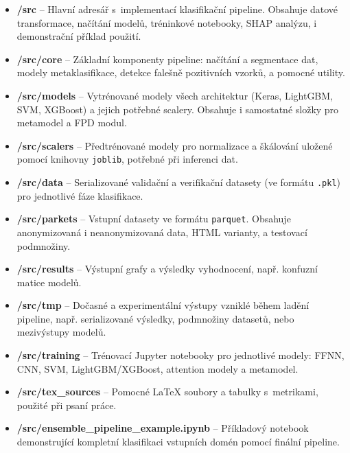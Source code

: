 \begin{itemize}
    \item \textbf{/src} – Hlavní adresář s~implementací klasifikační pipeline. Obsahuje datové transformace, načítání modelů, tréninkové notebooky, SHAP analýzu, i demonstrační příklad použití.
    
    \item \textbf{/src/core} – Základní komponenty pipeline: načítání a segmentace dat, modely metaklasifikace, detekce falešně pozitivních vzorků, a pomocné utility.
    
    \item \textbf{/src/models} – Vytrénované modely všech architektur (Keras, LightGBM, SVM, XGBoost) a jejich potřebné scalery. Obsahuje i samostatné složky pro metamodel a FPD modul.
    
    \item \textbf{/src/scalers} – Předtrénované modely pro normalizace a škálování uložené pomocí knihovny \texttt{joblib}, potřebné při inferenci dat.
    
    \item \textbf{/src/data} – Serializované validační a verifikační datasety (ve formátu \texttt{.pkl}) pro jednotlivé fáze klasifikace.
    
    \item \textbf{/src/parkets} – Vstupní datasety ve formátu \texttt{parquet}. Obsahuje anonymizovaná i neanonymizovaná data, HTML varianty, a testovací podmnožiny.
    
    \item \textbf{/src/results} – Výstupní grafy a výsledky vyhodnocení, např. konfuzní matice modelů.
    
    \item \textbf{/src/tmp} – Dočasné a experimentální výstupy vzniklé během ladění pipeline, např. serializované výsledky, podmnožiny datasetů, nebo mezivýstupy modelů.
    
    \item \textbf{/src/training} – Trénovací Jupyter notebooky pro jednotlivé modely: FFNN, CNN, SVM, LightGBM/XGBoost, attention modely a metamodel.
    
    \item \textbf{/src/tex\_sources} – Pomocné \LaTeX{} soubory a tabulky s~metrikami, použité při psaní práce.
    
    \item \textbf{/src/ensemble\_pipeline\_example.ipynb} – Příkladový notebook demonstrující kompletní klasifikaci vstupních domén pomocí finální pipeline.
    

\end{itemize}
